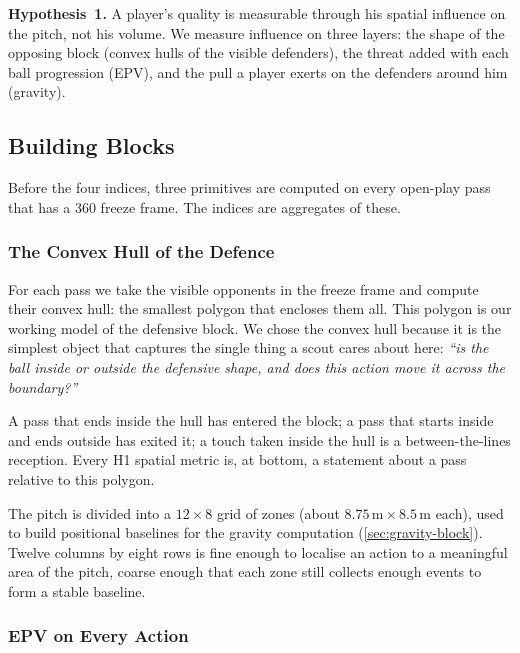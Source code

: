 \documentclass[12pt,a4paper]{article}
\begin{document}
\textbf{Hypothesis~1.}
A player's quality is measurable through his spatial influence on the pitch, not his volume.
We measure influence on three layers: the shape of the opposing block (convex hulls of the visible defenders), the threat added with each ball progression (EPV), and the pull a player exerts on the defenders around him (gravity).

\subsection{Building Blocks}\label{sec:h1-blocks}

Before the four indices, three primitives are computed on every open-play pass that has a 360 freeze frame.
The indices are aggregates of these.

\subsubsection{The Convex Hull of the Defence}\label{sec:hull}

For each pass we take the visible opponents in the freeze frame and compute their convex hull: the smallest polygon that encloses them all.
This polygon is our working model of the defensive block.
We chose the convex hull because it is the simplest object that captures the single thing a scout cares about here: \emph{``is the ball inside or outside the defensive shape, and does this action move it across the boundary?''}

A pass that ends inside the hull has entered the block; a pass that starts inside and ends outside has exited it; a touch taken inside the hull is a between-the-lines reception.
Every H1 spatial metric is, at bottom, a statement about a pass relative to this polygon.

The pitch is divided into a $12 \times 8$ grid of zones (about $8.75\,\text{m} \times 8.5\,\text{m}$ each), used to build positional baselines for the gravity computation (\cref{sec:gravity-block}).
Twelve columns by eight rows is fine enough to localise an action to a meaningful area of the pitch, coarse enough that each zone still collects enough events to form a stable baseline.

\subsubsection{EPV on Every Action}\label{sec:epv-action}
\end{document}
